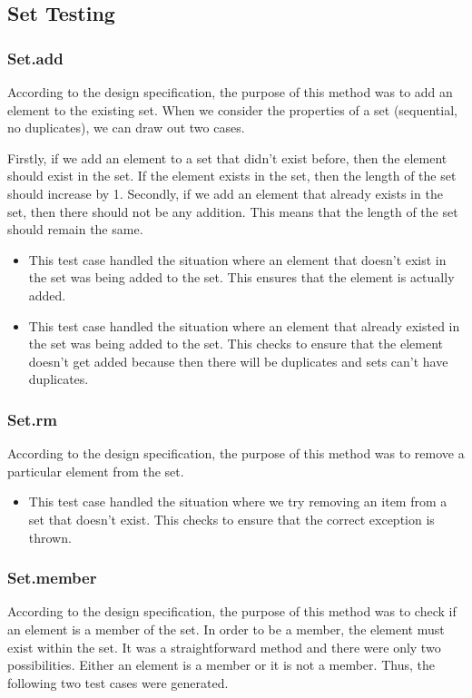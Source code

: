 \documentclass[12pt]{article}
\begin{document}
\bigskip


\subsection{Set Testing}

\subsubsection{Set.add}
According to the design specification, the purpose of this method was to add an element to the existing set. 
When we consider the properties of a set (sequential, no duplicates), we can draw out two cases.

Firstly, if we add an element to a set that didn't exist before, then the element should exist in the set. If 
the element exists in the set, then the length of the set should increase by 1. Secondly, if we add an element 
that already exists in the set, then there should not be any addition. This means
that the length of the set should remain the same.


\begin{itemize}
  \item This test case handled the situation where an element that doesn't exist in the set was being added to the set. This ensures that the element is actually added.
  \item This test case handled the situation where an element that already existed in the set was being added to the set. This checks to ensure that the element doesn't get added because then there will be duplicates and sets can't have duplicates.
\end{itemize}


\subsubsection{Set.rm}
According to the design specification, the purpose of this method was to remove a particular element from the set.
\begin{itemize}
  \item This test case handled the situation where we try removing an item from a set that doesn't exist. This checks to ensure that the correct exception is thrown.
\end{itemize}


\subsubsection{Set.member}
According to the design specification, the purpose of this method was to check if an element is a member of the set.
In order to be a member, the element must exist within the set. It was a straightforward method and there were only 
two possibilities. Either an element is a member or it is not a member. Thus, the following two test cases were generated.
\end{document}
